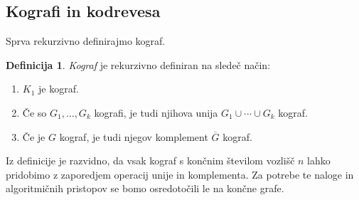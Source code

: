 \documentclass[12pt,a4paper,twoside]{article}
\theoremstyle{definition} %
\newtheorem{definicija}{Definicija}[section]
\theoremstyle{plain} %
\numberwithin{equation}{section}  %
\begin{document}
\subsection{Kografi in kodrevesa}\label{kografiInKodrevesa}
Sprva rekurzivno definirajmo kograf.
\begin{definicija}
\emph{Kograf} je rekurzivno definiran na sledeč način:
\begin{enumerate}[label=($\roman*$)]
\item $K_1$ je kograf.
\item Če so $G_1, \dots, G_k$ kografi, je tudi njihova unija $G_1 \cup \cdots \cup G_k$ kograf.
\item Če je $G$ kograf, je tudi njegov komplement $\overline{G}$ kograf.
\end{enumerate}
\end{definicija}
Iz definicije je razvidno, da vsak kograf s končnim številom vozlišč $n$ lahko pridobimo z zaporedjem operacij unije in komplementa. Za potrebe te naloge in algoritmičnih pristopov se bomo osredotočili le na končne grafe.
\end{document}
